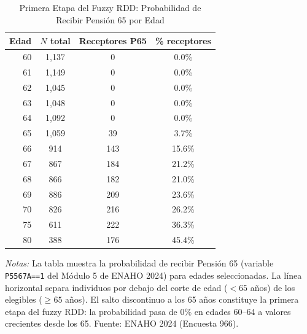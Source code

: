 \begin{table}[htbp]
\centering
\caption{Primera Etapa del Fuzzy RDD: Probabilidad de Recibir Pensión 65 por Edad}
\label{tab:primera_etapa}
\begin{threeparttable}
\begin{tabular}{r ccc}
\toprule
Edad & $N$ total & Receptores P65 & \% receptores \\
\midrule
  60 & 1{,}137 & 0 & 0.0\% \\
  61 & 1{,}149 & 0 & 0.0\% \\
  62 & 1{,}045 & 0 & 0.0\% \\
  63 & 1{,}048 & 0 & 0.0\% \\
  64 & 1{,}092 & 0 & 0.0\% \\
\midrule
  65 & 1{,}059 & 39 & 3.7\% \\
  66 & 914 & 143 & 15.6\% \\
  67 & 867 & 184 & 21.2\% \\
  68 & 866 & 182 & 21.0\% \\
  69 & 886 & 209 & 23.6\% \\
  70 & 826 & 216 & 26.2\% \\
  75 & 611 & 222 & 36.3\% \\
  80 & 388 & 176 & 45.4\% \\
\bottomrule
\end{tabular}
\begin{tablenotes}[flushleft]
\footnotesize
\item \textit{Notas:} La tabla muestra la probabilidad de recibir Pensión 65 (variable \texttt{P5567A==1} del Módulo 5 de ENAHO 2024) para edades seleccionadas. La línea horizontal separa individuos por debajo del corte de edad ($< 65$ años) de los elegibles ($\geq 65$ años). El salto discontinuo a los 65 años constituye la primera etapa del fuzzy RDD: la probabilidad pasa de 0\% en edades 60--64 a valores crecientes desde los 65. Fuente: ENAHO 2024 (Encuesta 966).
\end{tablenotes}
\end{threeparttable}
\end{table}